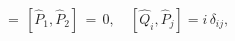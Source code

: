 \begin{equation} 
[{\hat Q}_1,{\hat Q}_2] \,=\, [{\hat P}_1,{\hat P}_2] \,=\, 0, \quad
[{\hat Q}_i,{\hat P}_j]=i\,\delta_{ij}, 
\label{[QP]}
\end{equation} 
